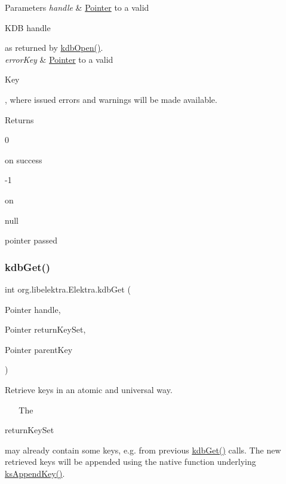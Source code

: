 \begin{DoxyParams}{Parameters}
{\em handle} & \hyperlink{}{Pointer} to a valid
\begin{DoxyCode}
KDB handle 
\end{DoxyCode}
 as returned by \hyperlink{}{kdb\+Open()}. \\
\hline
{\em error\+Key} & \hyperlink{}{Pointer} to a valid
\begin{DoxyCode}
Key 
\end{DoxyCode}
 , where issued errors and warnings will be made available. \\
\hline
\end{DoxyParams}
\begin{DoxyReturn}{Returns}

\begin{DoxyItemize}
\item 
\begin{DoxyCode}
0 
\end{DoxyCode}
 on success 
\item 
\begin{DoxyCode}
-1 
\end{DoxyCode}
 on
\begin{DoxyCode}
null 
\end{DoxyCode}
 pointer passed 
\end{DoxyItemize}
\end{DoxyReturn}
\mbox{\label{interfaceorg_1_1libelektra_1_1Elektra_a09ad2a446a215b6cce4cfb31d9871ac2}} 
\subsubsection{\texorpdfstring{kdb\+Get()}{kdbGet()}}
{\footnotesize\ttfamily int org.\+libelektra.\+Elektra.\+kdb\+Get (\begin{DoxyParamCaption}\item[{Pointer}]{handle,  }\item[{Pointer}]{return\+Key\+Set,  }\item[{Pointer}]{parent\+Key }\end{DoxyParamCaption})}



Retrieve keys in an atomic and universal way. 

~\newline
 ~\newline
 The
\begin{DoxyCode}
returnKeySet 
\end{DoxyCode}
 may already contain some keys, e.\+g. from previous \hyperlink{interfaceorg_1_1libelektra_1_1Elektra_a09ad2a446a215b6cce4cfb31d9871ac2}{kdb\+Get()} calls. The new retrieved keys will be appended using the native function underlying \hyperlink{}{ks\+Append\+Key()}.

